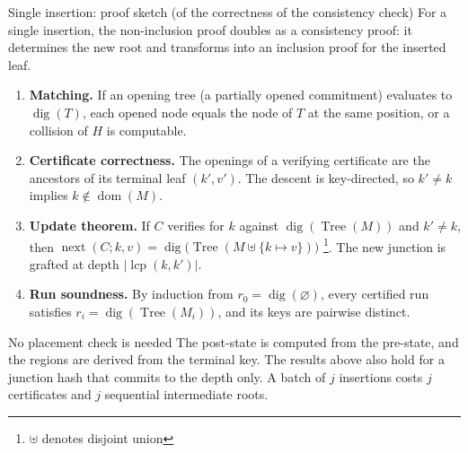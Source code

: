 \documentclass[aspectratio=169,10pt]{beamer}
\newcommand{\dig}{\operatorname{dig}}
\newcommand{\Tree}{\operatorname{Tree}}
\newcommand{\lcp}{\operatorname{lcp}}
\newcommand{\nxt}{\operatorname{next}}
\newcommand{\dom}{\operatorname{dom}}
\begin{document}
\begin{frame}{Single insertion: proof sketch (of the correctness of the consistency check)}
\small
For a single insertion, the non-inclusion proof doubles as a consistency proof: it determines the new root and transforms into an inclusion proof for the inserted leaf.

\begin{enumerate}
  \item \textbf{Matching.} If an opening tree (a partially opened commitment) evaluates to $\dig(T)$, each opened node equals the node of $T$ at the same position, or a collision of $H$ is computable.
  \item \textbf{Certificate correctness.} The openings of a verifying certificate are the ancestors of its terminal leaf $(k',v')$. The descent is key-directed, so $k' \neq k$ implies $k \notin \dom(M)$.
  \item \textbf{Update theorem.} If $C$ verifies for $k$ against $\dig(\Tree(M))$ and $k' \neq k$, then $\nxt(C;k,v) = \dig\big(\Tree(M \uplus \{k \mapsto v\})\big)$ \footnote{$\uplus$ denotes disjoint union}. The new junction is grafted at depth $|\lcp(k,k')|$.
  \item \textbf{Run soundness.} By induction from $r_0 = \dig(\varnothing)$, every certified run satisfies $r_i = \dig(\Tree(M_i))$, and its keys are pairwise distinct.
\end{enumerate}
\begin{block}{No placement check is needed}
\footnotesize
The post-state is computed from the pre-state, and the regions are derived from the terminal key. The results above also hold for a junction hash that commits to the depth only. A batch of $j$ insertions costs $j$ certificates and $j$ sequential intermediate roots.
\end{block}
\end{frame}
\end{document}

